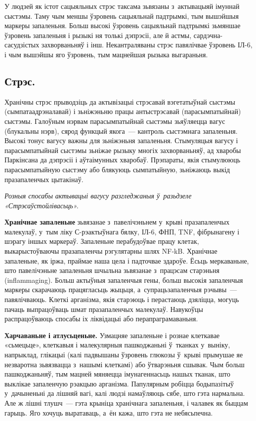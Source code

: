 У людзей як істот сацыяльных стрэс таксама зьвязаны з~актывацыяй імуннай сыстэмы. Таму чым меншы ўзровень сацыяльнай падтрымкі, тым вышэйшыя маркеры запаленьня. Больш высокі ўзровень сацыяльнай падтрымкі зьмяншае ўзровень запаленьня і рызыкі ня толькі дэпрэсіі, але й астмы, сардэчна-сасудзістых захворваньняў і інш. Некантраляваны стрэс павялічвае ўзровень ІЛ-6, і чым вышэйшы яго ўзровень, тым мацнейшая рызыка выгараньня.

\subsection*{Стрэс.}

Хранічны стрэс прыводзіць да актывізацыі стрэсавай вэгетатыўнай сыстэмы (сымпатаадрэналавай) і зьніжэньню працы антыстрэсавай (парасымпатыйнай) сыстэмы. Галоўным нэрвам парасымпатыйнай сыстэмы зьяўляецца вагус (блукальны нэрв), сярод функцый якога~--- кантроль сыстэмнага запаленьня. Высокі тонус вагусу важны для зьніжэньня запаленьня. Стымуляцыя вагусу і парасымпатыйнай сыстэмы зьніжае рызыку многіх захворваньняў, ад хваробы Паркінсана да дэпрэсіі і аўтаімунных хваробаў. Прэпараты, якія стымулююць парасымпатыйную сыстэму або блякуюць сымпатыйную, зьніжаюць выкід празапаленчых цытакінаў. 

\emph{Розныя спосабы актывацыі вагусу разгледжаныя ў~разьдзеле «Стрэсаўстойлівасьць».}

\textbf{Хранічнае запаленьне} зьвязанае з~павелічэньнем у~крыві празапаленчых малекулаў, у~тым ліку С-рэактыўнага бялку, ІЛ-6, ФНП, TNF, фібрынагену і шэрагу іншых маркераў. Запаленьне перабудоўвае працу клетак, выкарыстоўваючы празапаленчы рэгулятарны шлях NF-kB. Хранічнае запаленьне, як іржа, праймае наша цела і падточвае здароўе. Ёсьць меркаваньне, што павелічэньне запаленьня шчыльна зьвязанае з~працэсам старэньня (inflammaging). Больш актыўныя запаленчыя гены, больш высокія запаленчыя маркеры скарачаюць працягласьць жыцьця, а~супрацьзапаленчыя рэчывы~--- павялічваюць. Клеткі арганізма, якія старэюць і перастаюць дзяліцца, могуць пачаць выпрацоўваць шмат празапаленчых малекулаў. Навукоўцы распрацоўваюць спосабы іх ліквідацыі або перапраграмаваньня.

\textbf{Харчаваньне і атлусьценьне.} Узмацняе запаленьне і рознае клеткавае «сьмецьце», клеткавыя і малекулярныя пашкоджаньні ў~тканках у~выніку, напрыклад, глікацыі (калі падвышаны ўзровень глюкозы ў~крыві прымушае яе незваротна зьвязвацца з~нашымі клеткамі) або ўтварэньня сшывак. Чым больш пашкоджаньняў, тым мацней мяняецца імунагеннасьць нашых тканак, што выклікае запаленчую рэакцыю арганізма. Папулярным робіцца бодыпазітыў у~дачыненьні да лішняй вагі, калі людзі намаўляюць сябе, што гэта нармальна. Але ж лішні тлушч~--- гэта крыніца хранічнага запаленьня, і чалавек як быццам гарыць. Яго хочуць выратаваць, а~ён кажа, што гэта не небясьпечна.

